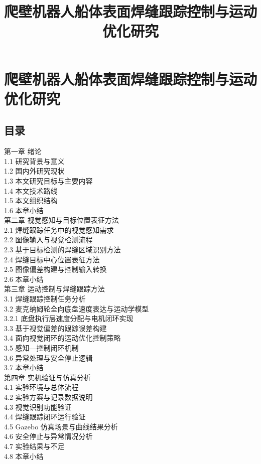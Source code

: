 \documentclass[UTF8,a4paper,12pt]{ctexrep}
\title{爬壁机器人船体表面焊缝跟踪控制与运动优化研究}
\author{}
\date{}
\begin{document}
\maketitle
\tableofcontents

\chapter*{爬壁机器人船体表面焊缝跟踪控制与运动优化研究}

\section{目录}

第一章 绪论\\
1.1 研究背景与意义\\
1.2 国内外研究现状\\
1.3 本文研究目标与主要内容\\
1.4 本文技术路线\\
1.5 本文组织结构\\
1.6 本章小结\\

第二章 视觉感知与目标位置表征方法\\
2.1 焊缝跟踪任务中的视觉感知需求\\
2.2 图像输入与视觉检测流程\\
2.3 基于目标检测的焊缝区域识别方法\\
2.4 焊缝目标中心位置表征方法\\
2.5 图像偏差构建与控制输入转换\\
2.6 本章小结\\

第三章 运动控制与焊缝跟踪方法\\
3.1 焊缝跟踪控制任务分析\\
3.2 麦克纳姆轮全向底盘速度表达与运动学模型\\
3.2.1 底盘执行层速度分配与电机闭环实现\\
3.3 基于视觉偏差的跟踪误差构建\\
3.4 面向视觉闭环的运动优化控制策略\\
3.5 感知—控制闭环机制\\
3.6 异常处理与安全停止逻辑\\
3.7 本章小结\\

第四章 实机验证与仿真分析\\
4.1 实验环境与总体流程\\
4.2 实验方案与记录数据说明\\
4.3 视觉识别功能验证\\
4.4 焊缝跟踪闭环运行验证\\
4.5 Gazebo 仿真场景与曲线结果分析\\
4.6 安全停止与异常情况分析\\
4.7 实验结果与不足\\
4.8 本章小结\\
\end{document}
